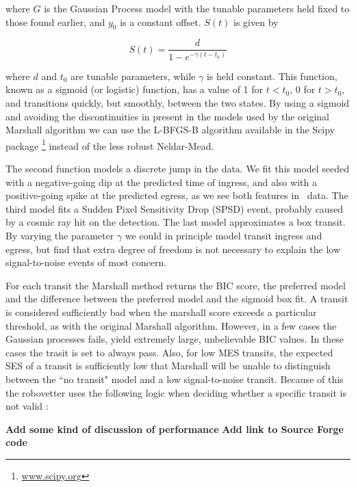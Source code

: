 \noindent
where $G$ is the Gaussian Process model with the tunable parameters held fixed to those found earlier, and $y_0$ is a constant offset. $S(t)$ is given by

\begin{equation}
S(t) = \frac{d}{1 - e^{-\gamma (t-t_0)} }
\end{equation}

\noindent
where $d$ and $t_0$ are tunable parameters, while $\gamma$ is held constant. This function, known as a sigmoid (or logistic) function, has a value of 1 for $t<t_0$, 0 for $t>t_0$, and transitions quickly, but smoothly, between the two states. By using a sigmoid and avoiding the discontinuities in present in the models used by the original Marshall algorithm we can use the L-BFGS-B algorithm \citep{Byrd95} available in the Scipy package \footnote{\url{www.scipy.org}} instead of the less robust Neldar-Mead.

The second function models a discrete jump in the data. We fit this model seeded with a negative-going dip at the predicted time of ingress, and also with a positive-going spike at the predicted egress, as we see both features in \Kepler\ data. The third model fits a Sudden Pixel Sensitivity Drop (SPSD) event, probably caused by a cosmic ray hit on the detection. The last model approximates a box transit. By varying the parameter $\gamma$ we could in principle model transit ingress and egress, but find that extra degree of freedom is not necessary to explain the low signal-to-noise events of most concern.

For each transit the Marshall method returns the BIC score, the preferred model and the difference between the preferred model and the sigmoid box fit.  A transit is considered sufficiently bad when the marshall score exceeds a particular threshold, as with the original Marshall algorithm.  However, in a few cases the Gaussian processes fails, yield extremely large, unbelievable BIC values. In these cases the trasit is set to always pass.  Also, for low MES transits, the expected SES of a transit is sufficiently low that Marshall will be unable to distinguish between the ``no transit" model and a low signal-to-noise transit.  Because of this the robovetter uses the following logic when deciding whether a specific transit is not valid :
\begin{equation}

\end{equation}

{\bf Add some kind of discussion of performance}
{\bf Add link to Source Forge code}
 